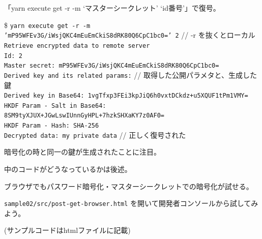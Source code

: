 \documentclass[12pt,dvipdfmx]{beamer}
\begin{document}
\begin{frame}
 「yarn execute get -r -m `マスターシークレット' `id番号'」で復号。
\begin{block}{}
\scriptsize
\$ \texttt{yarn execute get -r -m 'mP95WFEv3G/iWsjQKC4mEuEmCkiS8dRK80Q6CpC1bc0=' 2} // -r を抜くとローカル\\
\texttt{Retrieve encrypted data to remote server}\\
\texttt{Id: 2}\\
\texttt{Master secret: mP95WFEv3G/iWsjQKC4mEuEmCkiS8dRK80Q6CpC1bc0=}\\
{\color{blue}
\texttt{Derived key and its related params:} // 取得した公開パラメタと、生成した鍵\\
\texttt{\quad Derived key in Base64: 1vgTfxp3FEi3kpJiQ6h0vxtDCkdz+u5XQUF1tPm1VMY=}\\
\texttt{\quad HKDF Param - Salt in Base64: 8SM9tyXJUX+JGwLswIUnnGyHPL+7hzkSHXaKY7z0AF0=}\\
\texttt{\quad HKDF Param - Hash: SHA-256}}
\\
\texttt{Decrypted data: my private data} // 正しく復号された
\end{block}

暗号化の時と同一の鍵が生成されたことに注目。

\vspace{2ex}

中のコードがどうなっているかは後述。
\end{frame}


\begin{frame}
ブラウザでもパスワード暗号化・マスターシークレットでの暗号化が試せる。

\vspace{1ex}

\texttt{sample02/src/post-get-browser.html} を開いて開発者コンソールから試してみよう。

\vspace{1ex}

(サンプルコードはhtmlファイルに記載)
\end{frame}
\end{document}
